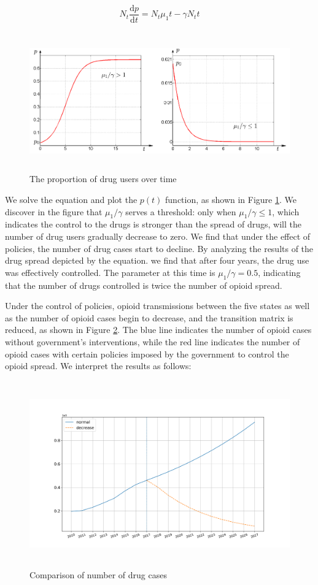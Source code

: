 \begin{equation}
	N_t\frac{\mathrm{d}p}{\mathrm{d}t}=N_t\mu_1t-\gamma N_t t
\end{equation}

\begin {figure}[h]
	\centering %
	\includegraphics[width=15cm,height=6cm]{figure/5.png}
	\caption{The proportion of drug users over time} %
	\label{SIS}
\end {figure}

We solve the equation and plot the $p(t)$ function, as shown in Figure \ref{SIS}. We discover in the figure that $\mu_1 / \gamma $ serves a threshold: only when $\mu_1 / \gamma \leq 1$, which indicates the control to the drugs is stronger than the spread of drugs, will the number of drug users gradually decrease to zero. We find that under the effect of policies, the number of drug cases start to decline. By analyzing the results of the drug spread depicted by the equation. we find that after four years, the drug use was effectively controlled. The parameter at this time is $\mu_1 / \gamma = 0.5$, indicating that the number of drugs controlled is twice the number of opioid spread.

Under the control of policies, opioid transmissions between the five states as well as the number of opioid cases begin to decrease, and the transition matrix is reduced, as shown in Figure \ref{trans_adjust}. The blue line indicates the number of opioid cases without government's interventions, while the red line indicates the number of opioid cases with certain policies imposed by the government to control the opioid spread. We interpret the results as follows:
\begin {figure}[h]
	\centering %
	\includegraphics[width=16cm,height=8cm]{figure/6.png}
	\caption{Comparison of number of drug cases} %
	\label{trans_adjust}
\end {figure}

